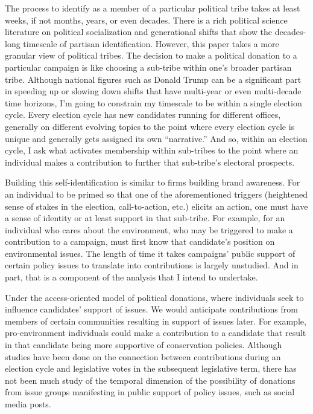 \documentclass[12pt,]{article}
\begin{document}
The process to identify as a member of a particular political tribe
takes at least weeks, if not months, years, or even decades. There is a
rich political science literature on political socialization and
generational shifts that show the decades-long timescale of partisan
identification. However, this paper takes a more granular view of
political tribes. The decision to make a political donation to a
particular campaign is like choosing a sub-tribe within one's broader
partisan tribe. Although national figures such as Donald Trump can be a
significant part in speeding up or slowing down shifts that have
multi-year or even multi-decade time horizons, I'm going to constrain my
timescale to be within a single election cycle. Every election cycle has
new candidates running for different offices, generally on different
evolving topics to the point where every election cycle is unique and
generally gets assigned its own ``narrative.'' And so, within an
election cycle, I ask what activates membership within sub-tribes to the
point where an individual makes a contribution to further that
sub-tribe's electoral prospects.

Building this self-identification is similar to firms building brand
awareness. For an individual to be primed so that one of the
aforementioned triggers (heightened sense of stakes in the election,
call-to-action, etc.) elicits an action, one must have a sense of
identity or at least support in that sub-tribe. For example, for an
individual who cares about the environment, who may be triggered to make
a contribution to a campaign, must first know that candidate's position
on environmental issues. The length of time it takes campaigns' public
support of certain policy issues to translate into contributions is
largely unstudied. And in part, that is a component of the analysis that
I intend to undertake.

Under the access-oriented model of political donations, where
individuals seek to influence candidates' support of issues. We would
anticipate contributions from members of certain communities resulting
in support of issues later. For example, pro-environment individuals
could make a contribution to a candidate that result in that candidate
being more supportive of conservation policies. Although studies have
been done on the connection between contributions during an election
cycle and legislative votes in the subsequent legislative term, there
has not been much study of the temporal dimension of the possibility of
donations from issue groups manifesting in public support of policy
issues, such as social media posts.
\end{document}
